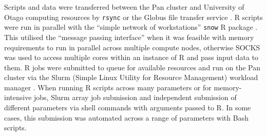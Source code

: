 Scripts and data were transferred between the Pan cluster and University of Otago computing resources by \texttt{rsync} or the Globus file transfer service \citep{Globus}. R scripts \citep{R_core} were run in parallel with the ``simple network of workstations'' \texttt{snow} R package \citet{snow}. This utilised the ``message passing interface'' \citep{Rmpi} when it was feasible with memory requirements to run in parallel across multiple compute nodes, otherwise SOCKS was used to access multiple cores within an instance of R and pass input data to them. R jobs were submitted to queue for available resources and run on the Pan cluster via the Slurm (Simple Linux Utility for Resource Management) workload manager \citep{slurm}. When running R scripts across many parameters or for memory-intensive jobs, Slurm array job submission and independent submission of different parameters via shell commands with arguments passed to R. In some cases, this submission was automated across a range of parameters with Bash scripts.



